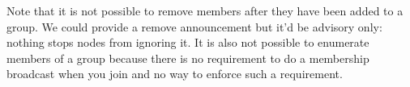 \documentclass{article}
\begin{document}
Note that it is not possible to remove members after they have been added to a group. We could provide a remove
announcement but it'd be advisory only: nothing stops nodes from ignoring it. It is also not possible to enumerate
members of a group because there is no requirement to do a membership broadcast when you join and no way to enforce
such a requirement.


%
%
%
\end{document}
